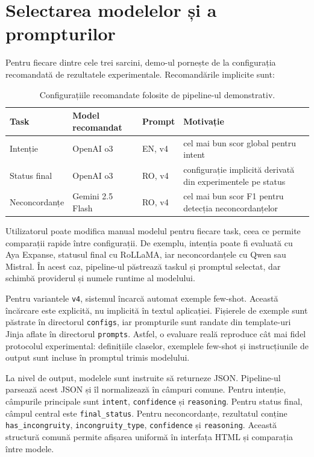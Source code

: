 \section{Selectarea modelelor și a prompturilor}
\label{sec:demo-pipeline-modele}

Pentru fiecare dintre cele trei sarcini, demo-ul pornește de la configurația recomandată de rezultatele experimentale. Recomandările implicite sunt:

\begin{table}[h]
    \centering
    \begin{tabular}{p{} p{} p{} p{}}
        \hline
        \textbf{Task} & \textbf{Model recomandat} & \textbf{Prompt} & \textbf{Motivație} \\
        \hline
        Intenție & OpenAI o3 & EN, v4 & cel mai bun scor global pentru intent \\
        Status final & OpenAI o3 & RO, v4 & configurație implicită derivată din experimentele pe status \\
        Neconcordanțe & Gemini 2.5 Flash & RO, v4 & cel mai bun scor F1 pentru detecția neconcordanțelor \\
        \hline
    \end{tabular}
    \caption{Configurațiile recomandate folosite de pipeline-ul demonstrativ.}
    \label{tab:demo-pipeline-recomandari}
\end{table}

Utilizatorul poate modifica manual modelul pentru fiecare task, ceea ce permite comparații rapide între configurații. De exemplu, intenția poate fi evaluată cu Aya Expanse, statusul final cu RoLLaMA, iar neconcordanțele cu Qwen sau Mistral. În acest caz, pipeline-ul păstrează taskul și promptul selectat, dar schimbă providerul și numele runtime al modelului.

Pentru variantele \texttt{v4}, sistemul încarcă automat exemple few-shot. Această încărcare este explicită, nu implicită în textul aplicației. Fișierele de exemple sunt păstrate în directorul \texttt{configs}, iar prompturile sunt randate din template-uri Jinja aflate în directorul \texttt{prompts}. Astfel, o evaluare reală reproduce cât mai fidel protocolul experimental: definițiile claselor, exemplele few-shot și instrucțiunile de output sunt incluse în promptul trimis modelului.

La nivel de output, modelele sunt instruite să returneze JSON. Pipeline-ul parsează acest JSON și îl normalizează în câmpuri comune. Pentru intenție, câmpurile principale sunt \texttt{intent}, \texttt{confidence} și \texttt{reasoning}. Pentru status final, câmpul central este \texttt{final\_status}. Pentru neconcordanțe, rezultatul conține \texttt{has\_incongruity}, \texttt{incongruity\_type}, \texttt{confidence} și \texttt{reasoning}. Această structură comună permite afișarea uniformă în interfața HTML și comparația între modele.

